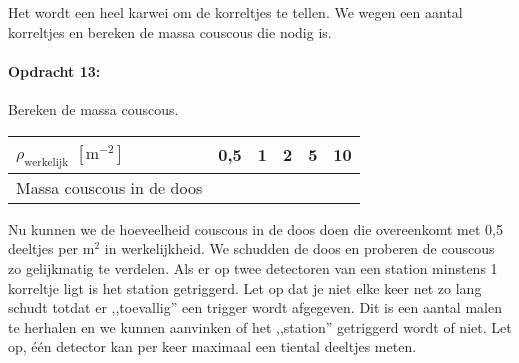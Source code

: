 \bigskip{}
Het wordt een heel karwei om de korreltjes te tellen. We wegen een
aantal korreltjes en bereken de massa couscous die nodig is.

\begin{minipage}[t]{1\columnwidth}%

\paragraph{Opdracht 13:}

Bereken de massa couscous.

\bigskip{}

\begin{tabular}{|x{.3\textwidth}|x{.1\textwidth}|x{.1\textwidth}
                |x{.1\textwidth}|x{.1\textwidth}|x{.1\textwidth}|}
    \hline 
    $\rho_\textrm{werkelijk}$ $\left[\mathrm{m^{-2}}\right]$ & 0,5 & 1 & 2 & 5 & 10 \\
    \hline 
    Massa couscous in de doos &  &  &  &  & \\
    \hline 
\end{tabular}
\end{minipage}

\bigskip{}


Nu kunnen we de hoeveelheid couscous in de doos doen die overeenkomt met
0,5 deeltjes per $\mathrm{m^{2}}$ in werkelijkheid. We schudden de doos
en proberen de couscous zo gelijkmatig te verdelen. Als er op twee
detectoren van een station minstens 1 korreltje ligt is het station
getriggerd. Let op dat je niet elke keer net zo lang schudt totdat er ,,toevallig''
een trigger wordt afgegeven. Dit is een aantal malen te herhalen en we
kunnen aanvinken of het ,,station'' getriggerd wordt of niet. Let op,
één detector kan per keer maximaal een tiental deeltjes meten.

